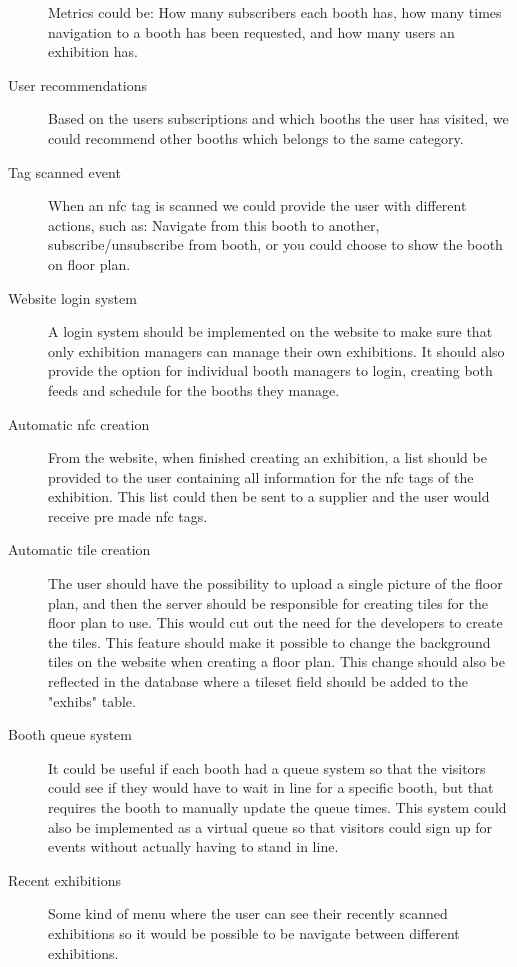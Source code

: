 \begin{description}
Metrics could be: How many subscribers each booth has, how many times navigation to a booth has been requested, and how many users an exhibition has.
\item[User recommendations] Based on the users subscriptions and which booths the user has visited, we could recommend other booths which belongs to the same category.
\item[Tag scanned event] When an \ac{nfc} tag is scanned we could provide the user with different actions, such as: Navigate from this booth to another, subscribe/unsubscribe from booth, or you could choose to show the booth on floor plan.
\item[Website login system] A login system should be implemented on the website to make sure that only exhibition managers can manage their own exhibitions. It should also provide the option for individual booth managers to login, creating both feeds and schedule for the booths they manage.
\item[Automatic \ac{nfc} creation] From the website, when finished creating an exhibition, a list should be provided to the user containing all information for the \ac{nfc} tags of the exhibition. This list could then be sent to a supplier and the user would receive pre made \ac{nfc} tags.
\item[Automatic tile creation] The user should have the possibility to upload a single picture of the floor plan, and then the server should be responsible for creating tiles for the floor plan to use. This would cut out the need for the developers to create the tiles. This feature should make it possible to change the background tiles on the website when creating a floor plan. This change should also be reflected in the database where a tileset field should be added to the "exhibs" table.
\item[Booth queue system] It could be useful if each booth had a queue system so that the visitors could see if they would have to wait in line for a specific booth, but that requires the booth to manually update the queue times. This system could also be implemented as a virtual queue so that visitors could sign up for events without actually having to stand in line.
\item[Recent exhibitions] Some kind of menu where the user can see their recently scanned exhibitions so it would be possible to be navigate between different exhibitions. 

\end{description}
